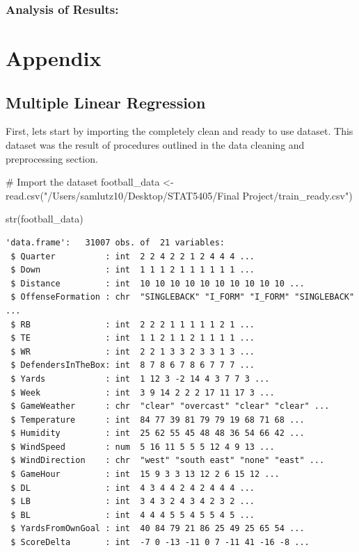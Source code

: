 \documentclass[
  super,
  preprint,
  3p]{elsarticle}
\newenvironment{Shaded}{\begin{snugshade}}{\end{snugshade}}
\newcommand{\CommentTok}[1]{\textcolor[rgb]{0.37,0.37,0.37}{#1}}
\newcommand{\FunctionTok}[1]{\textcolor[rgb]{0.28,0.35,0.67}{#1}}
\newcommand{\NormalTok}[1]{\textcolor[rgb]{0.00,0.23,0.31}{#1}}
\newcommand{\OtherTok}[1]{\textcolor[rgb]{0.00,0.23,0.31}{#1}}
\newcommand{\StringTok}[1]{\textcolor[rgb]{0.13,0.47,0.30}{#1}}
\begin{document}
\hypertarget{analysis-of-results}{%
\subsubsection{Analysis of Results:}\label{analysis-of-results}}

\hypertarget{appendix}{%
\section{Appendix}\label{appendix}}

\hypertarget{multiple-linear-regression}{%
\subsection{Multiple Linear
Regression}\label{multiple-linear-regression}}

First, lets start by importing the completely clean and ready to use
dataset. This dataset was the result of procedures outlined in the data
cleaning and preprocessing section.

\begin{Shaded}
\begin{Highlighting}[]
\CommentTok{\# Import the dataset}
\NormalTok{football\_data }\OtherTok{\textless{}{-}} \FunctionTok{read.csv}\NormalTok{(}\StringTok{"/Users/samlutz10/Desktop/STAT5405/Final Project/train\_ready.csv"}\NormalTok{)}

\FunctionTok{str}\NormalTok{(football\_data)}
\end{Highlighting}
\end{Shaded}

\begin{verbatim}
'data.frame':   31007 obs. of  21 variables:
 $ Quarter          : int  2 2 4 2 2 1 2 4 4 4 ...
 $ Down             : int  1 1 1 2 1 1 1 1 1 1 ...
 $ Distance         : int  10 10 10 10 10 10 10 10 10 10 ...
 $ OffenseFormation : chr  "SINGLEBACK" "I_FORM" "I_FORM" "SINGLEBACK" ...
 $ RB               : int  2 2 2 1 1 1 1 1 2 1 ...
 $ TE               : int  1 1 2 1 1 2 1 1 1 1 ...
 $ WR               : int  2 2 1 3 3 2 3 3 1 3 ...
 $ DefendersInTheBox: int  8 7 8 6 7 8 6 7 7 7 ...
 $ Yards            : int  1 12 3 -2 14 4 3 7 7 3 ...
 $ Week             : int  3 9 14 2 2 2 17 11 17 3 ...
 $ GameWeather      : chr  "clear" "overcast" "clear" "clear" ...
 $ Temperature      : int  84 77 39 81 79 79 19 68 71 68 ...
 $ Humidity         : int  25 62 55 45 48 48 36 54 66 42 ...
 $ WindSpeed        : num  5 16 11 5 5 5 12 4 9 13 ...
 $ WindDirection    : chr  "west" "south east" "none" "east" ...
 $ GameHour         : int  15 9 3 3 13 12 2 6 15 12 ...
 $ DL               : int  4 3 4 4 2 4 2 4 4 4 ...
 $ LB               : int  3 4 3 2 4 3 4 2 3 2 ...
 $ BL               : int  4 4 4 5 5 4 5 5 4 5 ...
 $ YardsFromOwnGoal : int  40 84 79 21 86 25 49 25 65 54 ...
 $ ScoreDelta       : int  -7 0 -13 -11 0 7 -11 41 -16 -8 ...
\end{verbatim}
\end{document}
